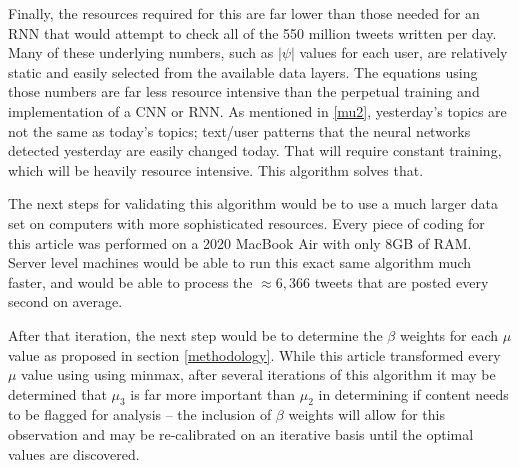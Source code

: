 \documentclass[preprint,12pt]{elsarticle}
\begin{document}
Finally, the resources required for this are far lower than those needed for an RNN that would attempt to check all of the 550 million tweets written per day. Many of these underlying numbers, such as $|\psi|$ values for each user, are relatively static and easily selected from the available data layers. The equations using those numbers are far less resource intensive than the perpetual training and implementation of a CNN or RNN. As mentioned in \ref{mu2}, yesterday's topics are not the same as today's topics; text/user patterns that the neural networks detected yesterday are easily changed today. That will require constant training, which will be heavily resource intensive. This algorithm solves that.

The next steps for validating this algorithm would be to use a much larger data set on computers with more sophisticated resources. Every piece of coding for this article was performed on a 2020 MacBook Air with only 8GB of RAM. Server level machines would be able to run this exact same algorithm much faster, and would be able to process the $\approx 6,366$ tweets that are posted every second on average. 

After that iteration, the next step would be to determine the $\beta$ weights for each $\mu$ value as proposed in section \ref{methodology}. While this article transformed every $\mu$ value using using minmax, after several iterations of this algorithm it may be determined that $\mu_3$ is far more important than $\mu_2$ in determining if content needs to be flagged for analysis -- the inclusion of $\beta$ weights will allow for this observation and may be re-calibrated on an iterative basis until the optimal values are discovered.

\newpage
 

\end{document}

